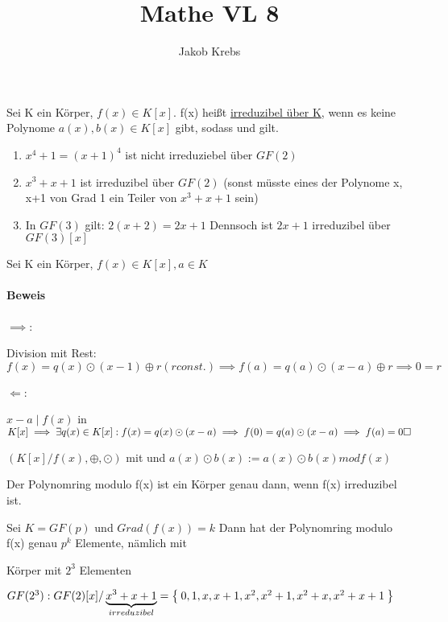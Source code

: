 \documentclass{../tudscript}
\author{Jakob Krebs}
\title{Mathe VL 8}
\begin{document}
Sei K ein Körper, $f(x) \in K[x]$.
f(x) heißt \underline{irreduzibel über K}, wenn es keine Polynome $a(x), b(x) \in K[x]$ gibt, sodass
und
gilt.

\begin{enumerate}
\item $x^4 + 1 = (x+1)^4$ ist nicht irreduziebel über $GF(2)$
\item $x^3 + x + 1$ ist irreduzibel über $GF(2)$ (sonst müsste eines der Polynome x, x+1 von Grad 1 ein Teiler von $x^3 + x+1$ sein)
\item In $GF(3)$ gilt: $2 (x+2) = 2x+1$ Dennsoch ist $2x+1$ irreduzibel über $GF(3)[x]$
\end{enumerate}

Sei K ein Körper, $f(x) \in K[x], a \in K$
\paragraph{Beweis}
$\implies$:

Division mit Rest: $f(x) = q(x) \odot (x-1) \oplus r (r const.) \implies f(a) = q(a) \odot (x-a) \oplus r \implies 0 = r$

$\Leftarrow$:

$x-a \mid f(x)$ in $K[x] \implies \exists q(x) \in K[x]: f(x) = q(x) \odot (x-a) \implies f(0) = q(a) \odot (x-a) \implies f(a) = 0 \hfill\square$

$(K[x]/f(x), \oplus, \odot)$ mit
und $a(x) \odot b(x) := a(x) \odot b(x) mod f(x)$

Der Polynomring modulo f(x) ist ein Körper genau dann, wenn f(x) irreduzibel ist.

Sei $K = GF(p)$ und $Grad(f(x)) = k$
Dann hat der Polynomring modulo f(x) genau $p^k$ Elemente, nämlich
mit

Körper mit $2^3$ Elementen

$GF(2^3): GF(2)[x]/ \underbrace{x^3 + x + 1}_{irreduzibel} = \Set{0, 1, x, x+1, x^2, x^2 + 1, x^2 + x, x^2 + x + 1}$
\end{document}
